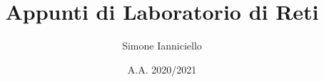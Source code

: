 \documentclass[a4paper,11pt,twoside]{book}
\begin{document}
    \title{Appunti di Laboratorio di Reti}
    \author{Simone Ianniciello}
    \date{A.A. 2020/2021}
    \maketitle
    \tableofcontents

    
\end{document}

